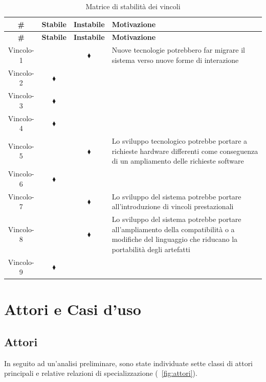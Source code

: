 \begin{longtable}{|c|c|c|p{7cm}|}
\caption{Matrice di stabilità dei vincoli}\label{tab:stabilita-vincoli}\\
\hline\hline
\rowcolor{grigio-chiarissimo} \textbf{\#} & \textbf{Stabile} & \textbf{Instabile} & \textbf{Motivazione} \\
\hline\hline
\endfirsthead
\hline\hline
\rowcolor{grigio-chiarissimo} \textbf{\#} & \textbf{Stabile} & \textbf{Instabile} & \textbf{Motivazione} \\
\hline\hline
\endhead

Vincolo-1 &  & $\blacklozenge$ & Nuove tecnologie potrebbero far migrare il sistema verso nuove forme di interazione \\ 
\hline 
Vincolo-2 & $\blacklozenge$ &  &  \\ 
\hline 
Vincolo-3 & $\blacklozenge$ & & \\ 
\hline 
Vincolo-4 & $\blacklozenge$ & & \\ 
\hline 
Vincolo-5 &  & $\blacklozenge$ & Lo sviluppo tecnologico potrebbe portare a richieste hardware differenti come conseguenza di un ampliamento delle richieste software \\ 
\hline 
Vincolo-6 & $\blacklozenge$ & & \\ 
\hline 
Vincolo-7 & & $\blacklozenge$ & Lo sviluppo del sistema potrebbe portare all'introduzione di vincoli prestazionali \\ 
\hline 
Vincolo-8 & & $\blacklozenge$ & Lo sviluppo del sistema potrebbe portare all'ampliamento della compatibilità o a modifiche del linguaggio che riducano la portabilità degli artefatti\\ 
\hline 
Vincolo-9 & $\blacklozenge$ & & \\ 
\hline

\end{longtable}


\section{Attori e Casi d'uso}

\subsection{Attori}

In seguito ad un'analisi preliminare, sono state individuate sette classi di attori principali e relative relazioni di specializzazione (\figurename~\ref{fig:attori}).

